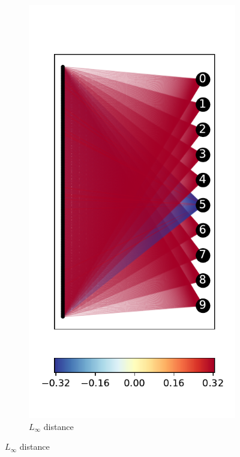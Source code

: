 \documentclass{easychair}
\begin{document}
 
\begin{figure}
\centering
  \begin{subfigure}{0.4\linewidth}
  \includegraphics[width=\linewidth]{../data/results/problem3/last_layer_1_wm_example.pdf}
     \caption{$L_\infty$ distance}

\end{subfigure}
\end{figure}
\end{document}
